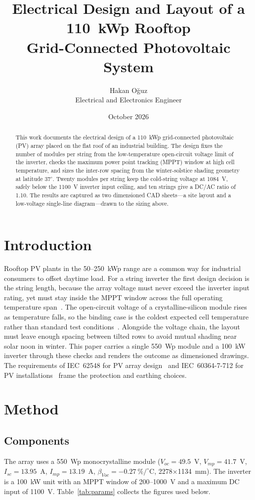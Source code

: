 \documentclass[11pt,a4paper]{article}
\title{Electrical Design and Layout of a 110~kWp Rooftop\\ Grid-Connected Photovoltaic System}
\author{Hakan O\u{g}uz\\ \small Electrical and Electronics Engineer}
\date{October 2026}
\begin{document}
\maketitle

\begin{abstract}
This work documents the electrical design of a 110~kWp grid-connected photovoltaic (PV) array
placed on the flat roof of an industrial building. The design fixes the number of modules per
string from the low-temperature open-circuit voltage limit of the inverter, checks the maximum
power point tracking (MPPT) window at high cell temperature, and sizes the inter-row spacing from
the winter-solstice shading geometry at latitude 37$^\circ$. Twenty modules per string keep the
cold-string voltage at 1084~V, safely below the 1100~V inverter input ceiling, and ten strings
give a DC/AC ratio of 1.10. The results are captured as two dimensioned CAD sheets---a site
layout and a low-voltage single-line diagram---drawn to the sizing above.
\end{abstract}

\section{Introduction}
Rooftop PV plants in the 50--250~kWp range are a common way for industrial consumers to offset
daytime load. For a string inverter the first design decision is the string length, because the
array voltage must never exceed the inverter input rating, yet must stay inside the MPPT window
across the full operating temperature span~\citep{masters2013}. The open-circuit voltage of a
crystalline-silicon module rises as temperature falls, so the binding case is the coldest expected
cell temperature rather than standard test conditions~\citep{luque2011}. Alongside the voltage
chain, the layout must leave enough spacing between tilted rows to avoid mutual shading near solar
noon in winter. This paper carries a single 550~Wp module and a 100~kW inverter through these
checks and renders the outcome as dimensioned drawings. The requirements of IEC~62548 for PV array
design~\citep{iec62548} and IEC~60364-7-712 for PV installations~\citep{iec60364712} frame the
protection and earthing choices.

\section{Method}
\subsection{Components}
The array uses a 550~Wp monocrystalline module ($V_{oc}=49.5$~V, $V_{mp}=41.7$~V,
$I_{sc}=13.95$~A, $I_{mp}=13.19$~A, $\beta_{Voc}=-0.27~\%/^\circ$C, 2278$\times$1134~mm). The
inverter is a 100~kW unit with an MPPT window of 200--1000~V and a maximum DC input of 1100~V.
Table~\ref{tab:params} collects the figures used below.
\end{document}
